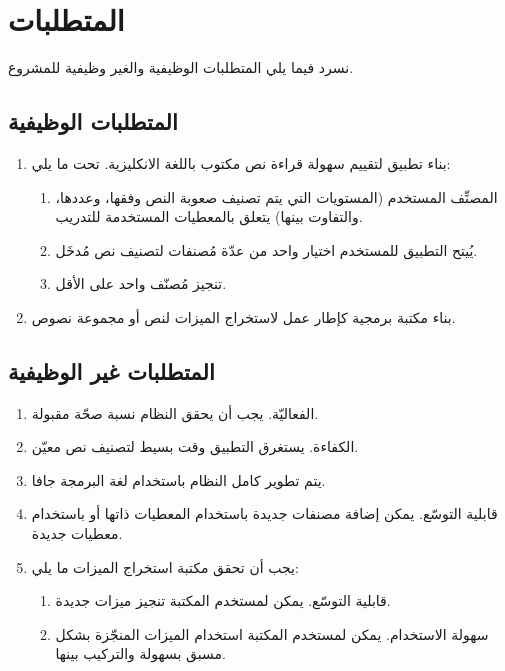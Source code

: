 \section{المتطلبات}
نسرد فيما يلي المتطلبات الوظيفية والغير وظيفية للمشروع.

\subsection{المتطلبات الوظيفية}

\begin{enumerate}
	\item 
	بناء تطبيق لتقييم سهولة قراءة نص مكتوب باللغة الانكليزية. تحت ما يلي:
	\begin{enumerate}
		\item 
		المصنِّف المستخدم (المستويات التي يتم تصنيف صعوبة النص وفقها، وعددها، والتفاوت بينها)
		يتعلق بالمعطيات المستخدمة للتدريب.
		\item 
		يُيتح التطبيق للمستخدم اختيار واحد من عدّة مُصنفات لتصنيف نص مُدخَل.
		\item 
		تنجيز مُصنّف واحد على الأقل.
	\end{enumerate}

	\item 
	بناء مكتبة برمجية كإطار عمل لاستخراج الميزات لنص أو مجموعة نصوص.
\end{enumerate}




\subsection{المتطلبات غير الوظيفية}
\begin{enumerate}
	\item 
	الفعاليّة. يجب أن يحقق النظام نسبة صحّة مقبولة.
	\item 
	الكفاءة. يستغرق التطبيق وقت بسيط لتصنيف نص معيّن.
	\item 
	يتم تطوير كامل النظام باستخدام لغة البرمجة جافا.
	\item 
	قابلية التوسّع. يمكن إضافة مصنفات جديدة باستخدام المعطيات ذاتها أو باستخدام معطيات جديدة.
	\item 
	يجب أن تحقق مكتبة استخراج الميزات ما يلي:
	\begin{enumerate}
		\item 
		قابلية التوسّع. يمكن لمستخدم المكتبة تنجيز ميزات جديدة.
		\item
		سهولة الاستخدام. يمكن لمستخدم المكتبة استخدام الميزات المنجّزة بشكل مسبق بسهولة والتركيب بينها.
	\end{enumerate}

\end{enumerate}




